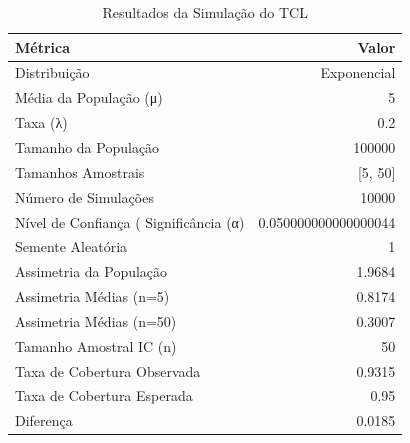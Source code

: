 \begin{table}[H]
\centering
\caption{Resultados da Simulação do TCL}
\label{tab:resultados_tcl}
\begin{tabular}{|l|r|}
\hline
\textbf{Métrica} & \textbf{Valor} \\
\hline
Distribuição & Exponencial \\
Média da População (μ) & 5 \\
Taxa (λ) & 0.2 \\
Tamanho da População & 100000 \\
Tamanhos Amostrais & [5, 50] \\
Número de Simulações & 10000 \\
Nível de Confiança (%
Significância (α) & 0.050000000000000044 \\
Semente Aleatória & 1 \\
Assimetria da População & 1.9684 \\
Assimetria Médias (n=5) & 0.8174 \\
Assimetria Médias (n=50) & 0.3007 \\
Tamanho Amostral IC (n) & 50 \\
Taxa de Cobertura Observada & 0.9315 \\
Taxa de Cobertura Esperada & 0.95 \\
Diferença & 0.0185 \\
\hline
\end{tabular}
\end{table}
